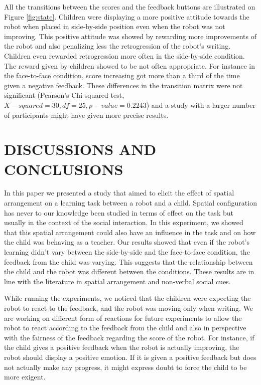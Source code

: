 \documentclass[letterpaper, 10 pt, conference]{ieeeconf}  %
\begin{document}
All the transitions between the scores and the feedback buttons are illustrated on Figure \ref{fig:state}.
Children were displaying a more positive attitude towards the robot when placed in side-by-side position even when the robot was not improving.
This positive attitude was showed by rewarding more improvements of the robot and also penalizing less the retrogression of the robot's writing.
Children even rewarded retrogression more often in the side-by-side condition.
The reward given by children showed to be not often appropriate. 
For instance in the face-to-face condition, score increasing got more than a third of the time given a negative feedback.
These differences in the transition matrix were not significant (Pearson's Chi-squared test, $X-squared = 30, df = 25, p-value = 0.2243$) and a study with a larger number of participants might have given more precise results.



\section{DISCUSSIONS AND CONCLUSIONS}
\vspace{-0.1cm}
In this paper we presented a study that aimed to elicit the effect of spatial arrangement on a learning task between a robot and a child.
Spatial configuration has never to our knowledge been studied in terms of effect on the task but usually in the context of the social interaction.
In this experiment, we showed that this spatial arrangement could also have an influence in the task and on how the child was behaving as a teacher.
Our results showed that even if the robot's learning didn't vary between the side-by-side and the face-to-face condition, the feedback from the child was varying.
This suggests that the relationship between the child and the robot was different between the conditions.
These results are in line with the literature in spatial arrangement and non-verbal social cues.

While running the experiments, we noticed that the children were expecting the robot to react to the feedback, and the robot was moving only when writing. 
We are working on different form of reactions for future experiments to allow the robot to react according to the feedback from the child and also in perspective with the fairness of the feedback regarding the score of the robot.
For instance, if the child gives a positive feedback when the robot is actually improving, the robot should display a positive emotion.
If it is given a positive feedback but does not actually make any progress, it might express doubt to force the child to be more exigent. 
\end{document}
